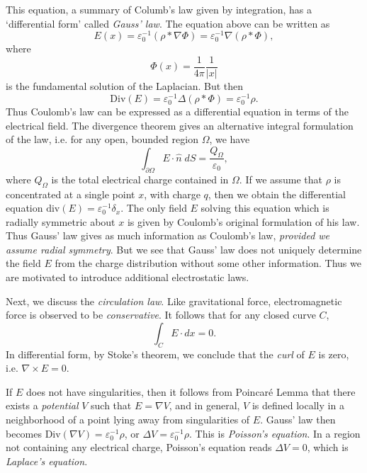 This equation, a summary of Columb's law given by integration, has a `differential form' called \emph{Gauss' law}. The equation above can be written as
%
\[ E(x) = \varepsilon_0^{-1} (\rho * \nabla \Phi) = \varepsilon_0^{-1} \nabla (\rho * \Phi), \]
%
where
%
\[ \Phi(x) = \frac{1}{4 \pi} \frac{1}{|x|} \]
%
is the fundamental solution of the Laplacian. But then
%
\[ \text{Div}(E) = \varepsilon_0^{-1} \Delta(\rho * \Phi) = \varepsilon_0^{-1} \rho. \]
%
Thus Coulomb's law can be expressed as a differential equation in terms of the electrical field. The divergence theorem gives an alternative integral formulation of the law, i.e. for any open, bounded region $\Omega$, we have
%
\[ \int_{\partial \Omega} E \cdot \widehat{n}\; dS = \frac{Q_\Omega}{\varepsilon_0}, \]
%
where $Q_\Omega$ is the total electrical charge contained in $\Omega$. If we assume that $\rho$ is concentrated at a single point $x$, with charge $q$, then we obtain the differential equation $\text{div}(E) = \varepsilon_0^{-1} \delta_x$. The only field $E$ solving this equation which is radially symmetric about $x$ is given by Coulomb's original formulation of his law. Thus Gauss' law gives as much information as Coulomb's law, \emph{provided we assume radial symmetry}. But we see that Gauss' law does not uniquely determine the field $E$ from the charge distribution without some other information. Thus we are motivated to introduce additional electrostatic laws.

Next, we discuss the \emph{circulation law}. Like gravitational force, electromagnetic force is observed to be \emph{conservative}. It follows that for any closed curve $C$,
%
\[ \int_C E \cdot dx = 0. \]
%
In differential form, by Stoke's theorem, we conclude that the \emph{curl} of $E$ is zero, i.e. $\nabla \times E = 0$.

If $E$ does not have singularities, then it follows from Poincar\'{e} Lemma that there exists a \emph{potential} $V$ such that $E = \nabla V$, and in general, $V$ is defined locally in a neighborhood of a point lying away from singularities of $E$. Gauss' law then becomes $\text{Div}(\nabla V) = \varepsilon_0^{-1} \rho$, or $\Delta V = \varepsilon_0^{-1} \rho$. This is \emph{Poisson's equation}. In a region not containing any electrical charge, Poisson's equation reads $\Delta V = 0$, which is \emph{Laplace's equation}.







